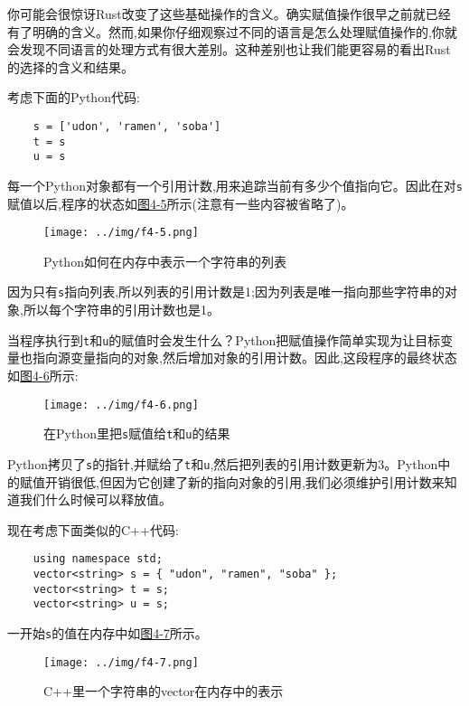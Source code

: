 你可能会很惊讶Rust改变了这些基础操作的含义。确实赋值操作很早之前就已经有了明确的含义。然而,如果你仔细观察过不同的语言是怎么处理赋值操作的,你就会发现不同语言的处理方式有很大差别。这种差别也让我们能更容易的看出Rust的选择的含义和结果。

考虑下面的Python代码:
\begin{verbatim}
    s = ['udon', 'ramen', 'soba']
    t = s
    u = s
\end{verbatim}

每一个Python对象都有一个引用计数,用来追踪当前有多少个值指向它。因此在对\texttt{s}赋值以后,程序的状态如\hyperref[f4-5]{图4-5}所示(注意有一些内容被省略了)。

\begin{figure}[htbp]
    \centering
    \texttt{[image: ../img/f4-5.png]}
    \caption{Python如何在内存中表示一个字符串的列表}
    \label{f4-5}
\end{figure}

因为只有\texttt{s}指向列表,所以列表的引用计数是1;因为列表是唯一指向那些字符串的对象,所以每个字符串的引用计数也是1。

当程序执行到\texttt{t}和\texttt{u}的赋值时会发生什么？Python把赋值操作简单实现为让目标变量也指向源变量指向的对象,然后增加对象的引用计数。因此,这段程序的最终状态如\hyperref[f4-6]{图4-6}所示:
\begin{figure}[htbp]
    \centering
    \texttt{[image: ../img/f4-6.png]}
    \caption{在Python里把\texttt{s}赋值给\texttt{t}和\texttt{u}的结果}
    \label{f4-6}
\end{figure}

Python拷贝了\texttt{s}的指针,并赋给了\texttt{t}和\texttt{u},然后把列表的引用计数更新为3。Python中的赋值开销很低,但因为它创建了新的指向对象的引用,我们必须维护引用计数来知道我们什么时候可以释放值。

现在考虑下面类似的C++代码:
\begin{verbatim}
    using namespace std;
    vector<string> s = { "udon", "ramen", "soba" };
    vector<string> t = s;
    vector<string> u = s;
\end{verbatim}

一开始\texttt{s}的值在内存中如\hyperref[f4-7]{图4-7}所示。

\begin{figure}[htbp]
    \centering
    \texttt{[image: ../img/f4-7.png]}
    \caption{C++里一个字符串的vector在内存中的表示}
    \label{f4-7}
\end{figure}

